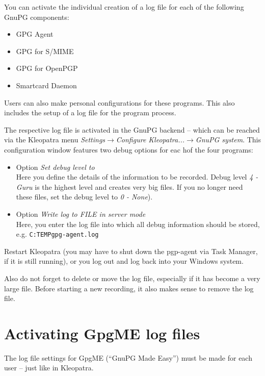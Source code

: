 \documentclass[a4paper,11pt,oneside,openright,titlepage]{scrbook}
\newcommand{\Menu}[1]{\textit{#1}}
\newcommand{\Filename}[1]{\small{\texttt{#1}}\normalsize}
\begin{document}
You can activate the individual creation of a log file for each of the
following GnuPG components:

\begin{itemize}
    \item GPG Agent
    \item GPG for S/MIME
    \item GPG for OpenPGP
    \item Smartcard Daemon
\end{itemize}

Users can also make personal configurations for these programs. This
also includes the setup of a log file for the program process.

The respective log file is activated in the GnuPG backend -- which can
be reached via the Kleopatra menu \Menu{Settings$\rightarrow$Configure
Kleopatra...$\rightarrow$GnuPG system}.  This configuration window
features two debug options for eac hof the four programs:

\begin{itemize}
    \item Option \Menu{Set debug level to }\\
        Here you define the details of the information to be recorded.
        Debug level \Menu{4 - Guru} is the highest level and creates
        very big files. If you no longer need these files, set the
        debug level to \Menu{0 - None}).
    \item Option \Menu{Write log to FILE in server mode}\\
        Here, you enter the log file into which all debug information
        should be stored, e.g.
        \Filename{C:\back{}TEMP\back{}gpg-agent.log}
\end{itemize}

Restart Kleopatra (you may have to shut down the pgp-agent via Task
Manager, if it is still running), or you log out and log back into
your Windows system.

Also do not forget to delete or move the log file, especially if it
has become a very large file. Before starting a new recording, it also
makes sense to remove the log file.

\clearpage
\section{Activating GpgME log files}

The log file settings for GpgME (``GnuPG Made Easy'') must be made for
each user -- just like in Kleopatra.
\end{document}
